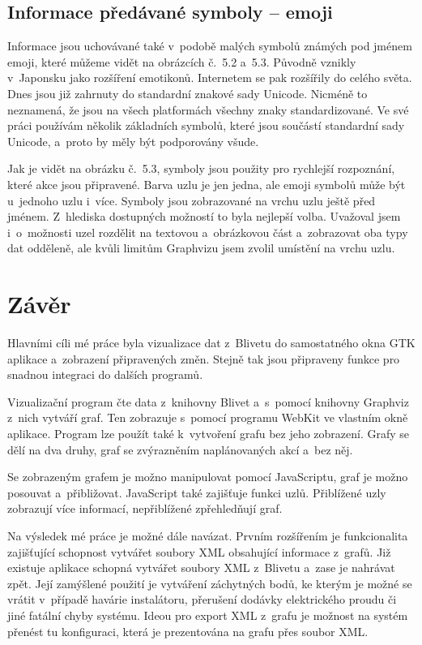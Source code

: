 \documentclass[printed,color,table,oneside,nolot,nolof]{fithesis}
\begin{document}
\section{Informace předávané symboly -- emoji}
  Informace jsou uchovávané také v~podobě malých symbolů známých pod jménem emoji, které můžeme vidět na obrázcích č.~5.2 a~5.3.
	Původně vznikly v~Japonsku jako rozšíření emotikonů. Internetem se pak rozšířily do
	celého světa. Dnes jsou již zahrnuty do standardní znakové sady Unicode\cite{emoji}. Nicméně to neznamená, že jsou na všech platformách všechny znaky standardizované.  Ve své práci používám několik základních symbolů, které 
	jsou součástí standardní sady Unicode, a~proto by měly být podporovány všude.

  Jak je vidět na obrázku č.~5.3, symboly jsou použity pro rychlejší rozpoznání, které akce jsou připravené. Barva uzlu je jen jedna, ale emoji symbolů může být u~jednoho uzlu i~více. Symboly jsou
	zobrazované na vrchu uzlu ještě před jménem. Z~hlediska dostupných možností to byla nejlepší volba. Uvažoval jsem i~o~možnosti uzel rozdělit na textovou a~obrázkovou část a~zobrazovat
	oba typy dat odděleně, ale kvůli limitům Graphvizu jsem zvolil umístění na vrchu uzlu.

\chapter{Závěr}
  Hlavními cíli mé práce byla vizualizace dat z~Blivetu do samostatného okna GTK aplikace a~zobrazení připravených změn. Stejně tak jsou připraveny funkce pro snadnou integraci
	do dalších programů.   

	Vizualizační program čte data z~knihovny Blivet a~s~pomocí knihovny Graphviz z~nich vytváří graf. Ten zobrazuje s~pomocí programu WebKit ve vlastním okně aplikace. Program lze
	použít také k~vytvoření grafu bez jeho zobrazení. Grafy se dělí na dva druhy, graf se zvýrazněním naplánovaných akcí a~bez něj.

	Se zobrazeným grafem je možno manipulovat pomocí JavaScrip\-tu\cite{javascript}, graf je možno posouvat a~přibližovat. JavaScript také zajišťuje funkci  uzlů. Přiblížené uzly zobrazují
	více informací, nepřiblížené zpřehledňují graf.

	Na výsledek mé práce je možné dále navázat.
	Prvním rozšířením je funkcionalita zajišťující schopnost vytvářet soubory XML obsahující informace z~grafů. 
	Již existuje aplikace schopná vytvářet soubory XML z~Blivetu a~zase je nahrávat zpět. Její zamýšlené
	použití je vytváření záchytných bodů, ke kterým je možné se vrátit v~případě havárie instalátoru, přerušení dodávky elektrického proudu či jiné fatální chyby systému. Ideou pro export
	XML z~grafu je možnost na systém přenést tu konfiguraci, která je prezentována na grafu přes soubor XML.
\end{document}

